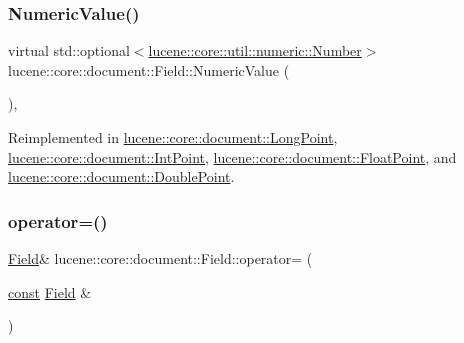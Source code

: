 \subsubsection{\texorpdfstring{Numeric\+Value()}{NumericValue()}}
{\footnotesize\ttfamily virtual std\+::optional$<$\mbox{\hyperlink{classlucene_1_1core_1_1util_1_1numeric_1_1Number}{lucene\+::core\+::util\+::numeric\+::\+Number}}$>$ lucene\+::core\+::document\+::\+Field\+::\+Numeric\+Value (\begin{DoxyParamCaption}{ }\end{DoxyParamCaption})\hspace{0.3cm}{\ttfamily [inline]}, {\ttfamily [virtual]}}



Reimplemented in \mbox{\hyperlink{classlucene_1_1core_1_1document_1_1LongPoint_a24068a492dbb14946de8de3bde3bd87b}{lucene\+::core\+::document\+::\+Long\+Point}}, \mbox{\hyperlink{classlucene_1_1core_1_1document_1_1IntPoint_a738e9e2cc41c77f835aac8f06da801ac}{lucene\+::core\+::document\+::\+Int\+Point}}, \mbox{\hyperlink{classlucene_1_1core_1_1document_1_1FloatPoint_ac2f070785fcce64c8214bb851fb6087c}{lucene\+::core\+::document\+::\+Float\+Point}}, and \mbox{\hyperlink{classlucene_1_1core_1_1document_1_1DoublePoint_aff495d94ea271af89212706b21aa3196}{lucene\+::core\+::document\+::\+Double\+Point}}.

\mbox{\label{classlucene_1_1core_1_1document_1_1Field_a9a165fa3cc612d355b6f3ef5deb87d50}} 
\subsubsection{\texorpdfstring{operator=()}{operator=()}\hspace{0.1cm}{\footnotesize\ttfamily [1/2]}}
{\footnotesize\ttfamily \mbox{\hyperlink{classlucene_1_1core_1_1document_1_1Field}{Field}}\& lucene\+::core\+::document\+::\+Field\+::operator= (\begin{DoxyParamCaption}\item[{\mbox{\hyperlink{ZlibCrc32_8h_a2c212835823e3c54a8ab6d95c652660e}{const}} \mbox{\hyperlink{classlucene_1_1core_1_1document_1_1Field}{Field}} \&}]{ }\end{DoxyParamCaption})\hspace{0.3cm}{\ttfamily [delete]}}

